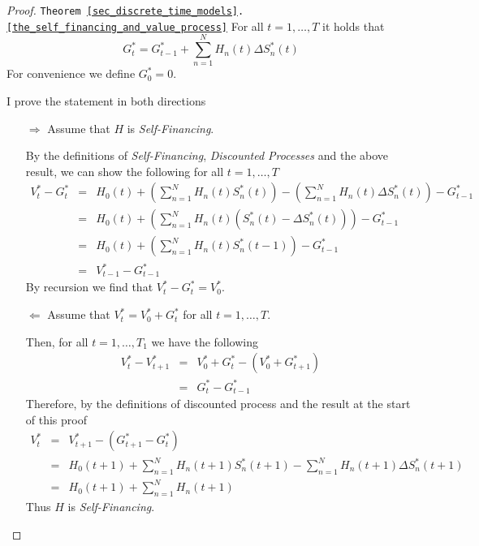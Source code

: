 \documentclass[11pt,a4paper]{article}
\begin{document}
  \begin{proof}{\texttt{Theorem \ref{sec_discrete_time_models}.\ref{the_self_financing_and_value_process}}}\label{proof_self_financing_and_value_process}
    For all $t=1,\dots,T$ it holds that
    \[ G_t^*=G_{t-1}^*+\sum_{n=1}^NH_n(t)\Delta S_n^*(t) \]
    For convenience we define $G_0^*=0$.
    \par I prove the statement in both directions
    \begin{itemize}
      \item[$\Longrightarrow$] Assume that $H$ is \textit{Self-Financing}.
      \par By the definitions of \textit{Self-Financing}, \textit{Discounted Processes} and the above result, we can show the following for all $t=1,\dots,T$
      \[\begin{array}{rcl}
        V_t^*-G_t^*&=&H_0(t)+\left(\sum_{n=1}^NH_n(t)S_n^*(t)\right)-\left(\sum_{n=1}^NH_n(t)\Delta S_n^*(t)\right)-G_{t-1}^*\\
        &=&H_0(t)+\left(\sum_{n=1}^NH_n(t)(S_n^*(t)-\Delta S_n^*(t))\right)-G_{t-1}^*\\
        &=&H_0(t)+\left(\sum_{n=1}^NH_n(t)S_n^*(t-1)\right)-G_{t-1}^*\\
        &=&V_{t-1}^*-G_{t-1}^*
      \end{array}\]
      By recursion we find that $V_t^*-G_t^*=V_0^*$.

      \item[$\Longleftarrow$] Assume that $V_t^*=V_0^*+G_t^*$ for all $t=1,\dots,T$.
      \par Then, for all $t=1,\dots,T_1$ we have the following
      \[\begin{array}{rcl}
        V_t^*-V_{t+1}^*&=&V_0^*+G_t^*-(V_0^*+G_{t+1}^*)\\
        &=&G_t^*-G_{t-1}^*
      \end{array}\]
      Therefore, by the definitions of discounted process and the result at the start of this proof
      \[\begin{array}{rcl}
        V_t^*&=&V_{t+1}^*-(G_{t+1}^*-G_t^*)\\
        &=&H_0(t+1)+\sum_{n=1}^NH_n(t+1)S_n^*(t+1)-\sum_{n=1}^NH_n(t+1)\Delta S_n^*(t+1)\\
        &=&H_0(t+1)+\sum_{n=1}^NH_n(t+1)
      \end{array}\]
      Thus $H$ is \textit{Self-Financing}.
    \end{itemize}
    \proved
  \end{proof}
\end{document}
